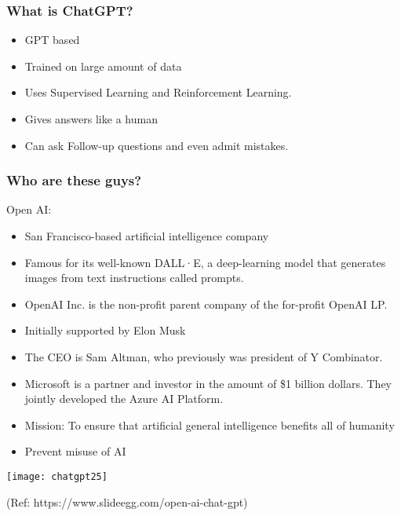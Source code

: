 \begin{frame}[fragile]\frametitle{What is ChatGPT?}


\begin{itemize}
\item GPT based
\item Trained on large amount of data
\item Uses Supervised Learning and Reinforcement Learning.
\item Gives answers like a human
\item Can ask Follow-up questions and even admit mistakes.
\end{itemize}	 

\end{frame}


\begin{frame}[fragile]\frametitle{Who are these guys?}

Open AI:
\begin{itemize}
\item San Francisco-based artificial intelligence company
\item Famous for its well-known DALL·E, a deep-learning model that generates images from text instructions called prompts.
\item OpenAI Inc. is the non-profit parent company of the for-profit OpenAI LP.
\item Initially supported by Elon Musk
\item The CEO is Sam Altman, who previously was president of Y Combinator.
\item Microsoft is a partner and investor in the amount of \$1 billion dollars. They jointly developed the Azure AI Platform.
\item Mission: To ensure that artificial general intelligence benefits all of humanity
\item Prevent misuse of AI
\end{itemize}	 

\begin{center}
\texttt{[image: chatgpt25]}
\end{center}				
{\tiny (Ref: https://www.slideegg.com/open-ai-chat-gpt)}


\end{frame}



